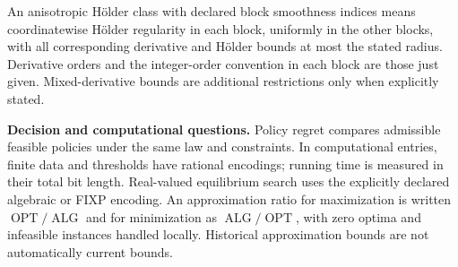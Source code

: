 \documentclass[11pt,a4paper]{article}
\begin{document}
An anisotropic H\"older class with declared block smoothness indices means
coordinatewise H\"older regularity in each block, uniformly in the other
blocks, with all corresponding derivative and H\"older bounds at most
the stated radius. Derivative orders and the integer-order convention in
each block are those just given. Mixed-derivative bounds are additional
restrictions only when explicitly stated.

\textbf{Decision and computational questions.}
Policy regret compares admissible feasible policies under the same law and
constraints. In computational entries, finite data and thresholds have
rational encodings; running time is measured in their total bit length.
Real-valued equilibrium search uses the explicitly declared algebraic or
FIXP encoding. An approximation ratio for maximization is written
$\operatorname{OPT}/\operatorname{ALG}$ and for minimization as
$\operatorname{ALG}/\operatorname{OPT}$, with zero optima and infeasible
instances handled locally. Historical approximation bounds are not
automatically current bounds.
\end{document}
